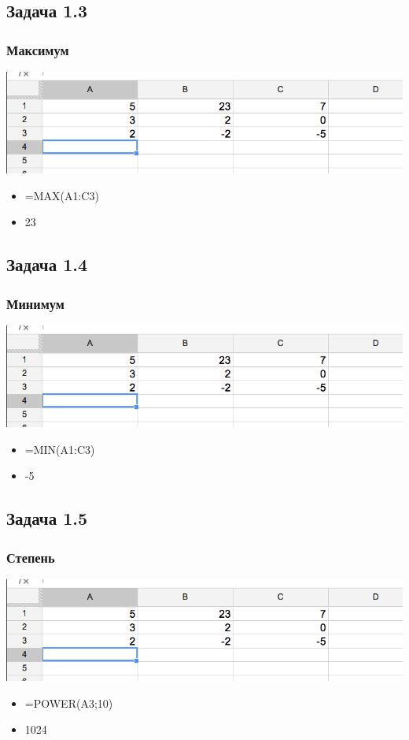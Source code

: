 \documentclass[compress,red]{beamer}
\begin{document}
\subsection{Задача 1.3}
\begin{frame}[fragile]
  \frametitle{Максимум}
  \centerline{\includegraphics[width=1.0\textwidth]{images/11.png}}
  \begin{itemize}[<+->]
      \item =MAX(A1:C3)
      \item 23
  \end{itemize}
\end{frame}

\subsection{Задача 1.4}
\begin{frame}[fragile]
  \frametitle{Минимум}
  \centerline{\includegraphics[width=1.0\textwidth]{images/11.png}}
  \begin{itemize}[<+->]
      \item =MIN(A1:C3)
      \item -5
  \end{itemize}
\end{frame}

\subsection{Задача 1.5}
\begin{frame}[fragile]
  \frametitle{Степень}
  \centerline{\includegraphics[width=1.0\textwidth]{images/11.png}}
  \begin{itemize}[<+->]
      \item =POWER(A3;10)
      \item 1024
  \end{itemize}
\end{frame}
\end{document}
